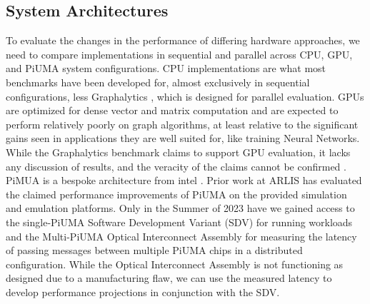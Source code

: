 \documentclass[letterpaper, 10pt]{article}
\begin{document}
\begin{multicols}{2}
{        \subsection{System Architectures}\label{section:architecutres}
        To evaluate the changes in the performance of differing hardware approaches, we need to compare implementations in sequential and parallel across CPU, GPU, and PiUMA system configurations. 
        CPU implementations are what most benchmarks have been developed for, almost exclusively in sequential configurations, less Graphalytics \cite{Capota2015}, which is designed for parallel evaluation. 
        GPUs are optimized for dense vector and matrix computation \cite{Dally2021} and are expected to perform relatively poorly on graph algorithms, at least relative to the significant gains seen in applications they are well suited for, like training Neural Networks. While the Graphalytics benchmark claims to support GPU evaluation, it lacks any discussion of results, and the veracity of the claims cannot be confirmed \cite{Capota2015}.
        PiMUA is a bespoke architecture from intel \cite{Aananthakrishnan2020}. 
        Prior work at ARLIS has evaluated the claimed performance improvements of PiUMA on the provided simulation and emulation platforms. 
        Only in the Summer of 2023 have we gained access to the single-PiUMA Software Development Variant (SDV) for running workloads and the Multi-PiUMA Optical Interconnect Assembly for measuring the latency of passing messages between multiple PiUMA chips in a distributed configuration. 
        While the Optical Interconnect Assembly is not functioning as designed due to a manufacturing flaw, we can use the measured latency to develop performance projections in conjunction with the SDV. 
        
}
\end{multicols}
\end{document}

